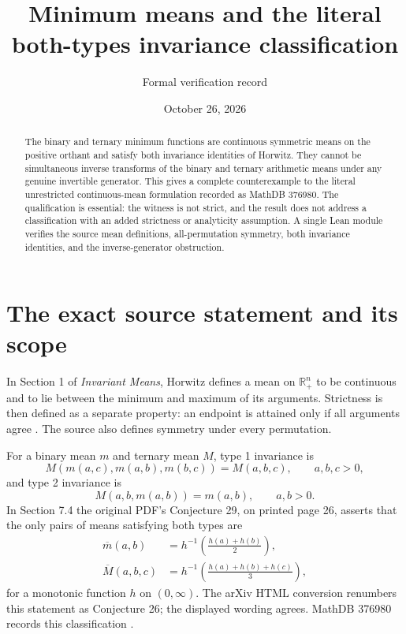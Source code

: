 \documentclass[11pt]{article}
\title{Minimum means and the literal both-types invariance classification}
\author{Formal verification record}
\date{October 26, 2026}
\newcommand{\R}{\mathbb R}
\begin{document}
\maketitle
\begin{abstract}
The binary and ternary minimum functions are continuous symmetric means on the positive orthant and satisfy both invariance identities of Horwitz. They cannot be simultaneous inverse transforms of the binary and ternary arithmetic means under any genuine invertible generator. This gives a complete counterexample to the literal unrestricted continuous-mean formulation recorded as MathDB 376980. The qualification is essential: the witness is not strict, and the result does not address a classification with an added strictness or analyticity assumption. A single Lean module verifies the source mean definitions, all-permutation symmetry, both invariance identities, and the inverse-generator obstruction.
\end{abstract}

\section{The exact source statement and its scope}
In Section 1 of \emph{Invariant Means}, Horwitz defines a mean on $\R_{+}^{n}$ to be continuous and to lie between the minimum and maximum of its arguments. Strictness is then defined as a separate property: an endpoint is attained only if all arguments agree \cite{horwitz}. The source also defines symmetry under every permutation.

For a binary mean $m$ and ternary mean $M$, type 1 invariance is
\begin{equation}\label{eq:type1}
 M(m(a,c),m(a,b),m(b,c))=M(a,b,c),\qquad a,b,c>0,
\end{equation}
and type 2 invariance is
\begin{equation}\label{eq:type2}
 M(a,b,m(a,b))=m(a,b),\qquad a,b>0.
\end{equation}
In Section 7.4 the original PDF's Conjecture 29, on printed page 26, asserts that the only pairs of means satisfying both types are
\begin{align}
 \overline m(a,b)&=h^{-1}\left(\frac{h(a)+h(b)}2\right),\label{eq:binary}\\
 \overline M(a,b,c)&=h^{-1}\left(\frac{h(a)+h(b)+h(c)}3\right),\label{eq:ternary}
\end{align}
for a monotonic function $h$ on $(0,\infty)$. The arXiv HTML conversion renumbers this statement as Conjecture 26; the displayed wording agrees. MathDB 376980 records this classification \cite{mathdb}.
\end{document}
